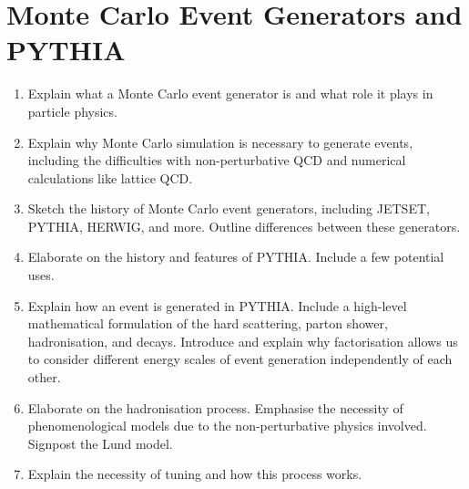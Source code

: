 \documentclass[12pt,a4paper]{report}
\begin{document}
\section{Monte Carlo Event Generators and PYTHIA}
\begin{enumerate}
\item Explain what a Monte Carlo event generator is and what role it plays in particle physics.
\item Explain why Monte Carlo simulation is necessary to generate events, including the difficulties with non-perturbative QCD and numerical calculations like lattice QCD.
\item Sketch the history of Monte Carlo event generators, including JETSET, PYTHIA, HERWIG, and more. Outline differences between these generators.
\item Elaborate on the history and features of PYTHIA. Include a few potential uses.
\item Explain how an event is generated in PYTHIA. Include a high-level mathematical formulation of the hard scattering, parton shower, hadronisation, and decays. Introduce and explain why factorisation allows us to consider different energy scales of event generation independently of each other.
\item Elaborate on the hadronisation process. Emphasise the necessity of phenomenological models due to the non-perturbative physics involved. Signpost the Lund model.
\item Explain the necessity of tuning and how this process works.
\end{enumerate}
\end{document}
